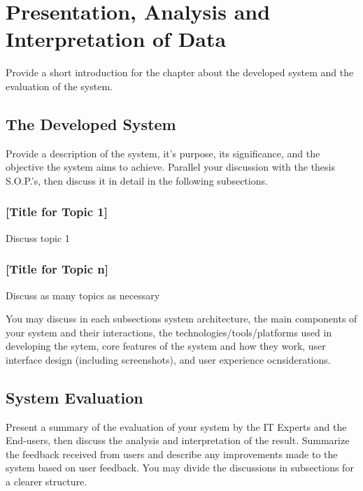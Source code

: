 \chapter{Presentation, Analysis and Interpretation of Data}

Provide a short introduction for the chapter about the developed system and the evaluation of the system.

\section{The Developed System}

Provide a description of the system, it's purpose, its significance, and the objective the system aims to achieve. Parallel your discussion with the thesis S.O.P.'s, then discuss it in detail in the following subsections. 

\subsection{[Title for Topic 1]}

Discuss topic 1

\subsection{[Title for Topic n]}
Discuss as many topics as necessary

You may discuss in each subsections system architecture, the main components of your system and their interactions, the technologies/tools/platforms used in developing the sytem, core features of the system and how they work, user interface design (including screenshots), and user experience ocnsiderations.

\section{System Evaluation}

Present a summary of the evaluation of your system by the IT Experts and the End-users, then discuss the analysis and interpretation of the result. Summarize the feedback received from users and describe any improvements made to the system based on user feedback. You may divide the discussions in subsections for a clearer structure.

